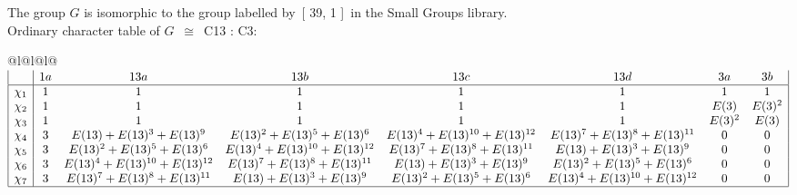 \documentclass[varwidth=\maxdimen,border=10]{standalone}
\begin{document}
The group $G$ is isomorphic to the group labelled by\ [ 39, 1 ]\ in the Small Groups library.\\
Ordinary character table of $G$\ $\cong$\ C13 : C3:\\
\begin{center}
\begin{tabular}{@{}l@{}l@{}l@{}}
\hline
\(\begin{array}{|l|ccccccc|}
  & 1a & 13a & 13b & 13c & 13d & 3a & 3b\\ \hline
\chi_{1} & 1 & 1 & 1 & 1 & 1 & 1 & 1\\
\chi_{2} & 1 & 1 & 1 & 1 & 1 & E(3) & E(3)^{2}\\
\chi_{3} & 1 & 1 & 1 & 1 & 1 & E(3)^{2} & E(3)\\
\chi_{4} & 3 & E(13)+E(13)^{3}+E(13)^{9} & E(13)^{2}+E(13)^{5}+E(13)^{6} & E(13)^{4}+E(13)^{10}+E(13)^{12} & E(13)^{7}+E(13)^{8}+E(13)^{11} & 0 & 0\\
\chi_{5} & 3 & E(13)^{2}+E(13)^{5}+E(13)^{6} & E(13)^{4}+E(13)^{10}+E(13)^{12} & E(13)^{7}+E(13)^{8}+E(13)^{11} & E(13)+E(13)^{3}+E(13)^{9} & 0 & 0\\
\chi_{6} & 3 & E(13)^{4}+E(13)^{10}+E(13)^{12} & E(13)^{7}+E(13)^{8}+E(13)^{11} & E(13)+E(13)^{3}+E(13)^{9} & E(13)^{2}+E(13)^{5}+E(13)^{6} & 0 & 0\\
\chi_{7} & 3 & E(13)^{7}+E(13)^{8}+E(13)^{11} & E(13)+E(13)^{3}+E(13)^{9} & E(13)^{2}+E(13)^{5}+E(13)^{6} & E(13)^{4}+E(13)^{10}+E(13)^{12} & 0 & 0\\
\hline
\end{array}\)\\
\end{tabular}
\end{center}
\end{document}
